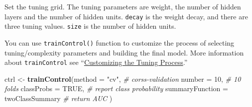 \documentclass[]{book}
\newenvironment{Shaded}{\begin{snugshade}}{\end{snugshade}}
\newcommand{\KeywordTok}[1]{\textcolor[rgb]{0.13,0.29,0.53}{\textbf{{#1}}}}
\newcommand{\DataTypeTok}[1]{\textcolor[rgb]{0.13,0.29,0.53}{{#1}}}
\newcommand{\DecValTok}[1]{\textcolor[rgb]{0.00,0.00,0.81}{{#1}}}
\newcommand{\FloatTok}[1]{\textcolor[rgb]{0.00,0.00,0.81}{{#1}}}
\newcommand{\StringTok}[1]{\textcolor[rgb]{0.31,0.60,0.02}{{#1}}}
\newcommand{\CommentTok}[1]{\textcolor[rgb]{0.56,0.35,0.01}{\textit{{#1}}}}
\newcommand{\OtherTok}[1]{\textcolor[rgb]{0.56,0.35,0.01}{{#1}}}
\newcommand{\NormalTok}[1]{{#1}}
\theoremstyle{definition}
\theoremstyle{definition}
\theoremstyle{remark}
\begin{document}
Set the tuning grid. The tuning parameters are weight, the number of
hidden layers and the number of hidden units. \texttt{decay} is the
weight decay, and there are three tuning values. \texttt{size} is the
number of hidden units.

\begin{Shaded}
\end{Shaded}

You can use \texttt{trainControl()} function to customize the process of
selecting tuning/complexity parameters and building the final model.
More information about \texttt{trainControl} see
``\href{https://topepo.github.io/caret/model-training-and-tuning.html\#custom}{Customizing
the Tuning Process}.''

\begin{Shaded}
\begin{Highlighting}[]
\NormalTok{ctrl <-}\StringTok{ }\KeywordTok{trainControl}\NormalTok{(}\DataTypeTok{method =} \StringTok{"cv"}\NormalTok{,  }\CommentTok{# corss-validation}
                     \DataTypeTok{number =} \DecValTok{10}\NormalTok{,  }\CommentTok{# 10 folds}
                     \DataTypeTok{classProbs =} \OtherTok{TRUE}\NormalTok{, }\CommentTok{# report class probability}
                     \DataTypeTok{summaryFunction =} \NormalTok{twoClassSummary }\CommentTok{# return AUC}
\NormalTok{)}
\end{Highlighting}
\end{Shaded}
\end{document}

